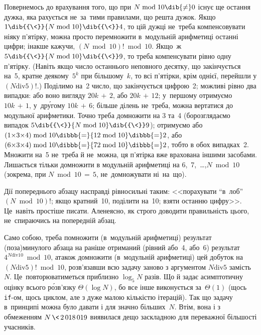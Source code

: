 Повернемось до врахування того, що при ${N\bmod10}\dib{{\neq}}0$ існує ще остання дужка, яка рахується не~за~тими правилами, що решта дужок. Якщо $1\dib{{\<}}{N\bmod10}\dib{{\<}}4$, то цій дужці не~треба компенсовувати ніяку п'ятірку, можна просто перемножити в~модульній арифметиці останні цифри; інакше кажучи, ${(N\bmod10)!\bmod10}$. Якщо~ж $5\dib{{\<}}{N\bmod10}\dib{{\<}}9$, то треба компенсувати рівно одну п'ятірку. (Навіть якщо число останнього неповного десятку, що закінчується на~5, кратне деякому~$5^k$ при більшому~$k$, то всі п'ятірки, крім однієї, перейшли у ${(N\mathbin{\mathrm{div}}5)!}$.) Поділимо на~2 число, що закінчується цифрою~2; можливі рівно два випадки: або воно вигляду $20k\,{+}\,2$, або $20k\,{+}\,12$; у~першому отримуємо $10k\,{+}\,1$, у~др\'{у}гому $10k\,{+}\,6$; більше ділень не~треба, можна вертатися до модульної арифметики. Точно треба домножити на 3 та~4 (бо\nolinebreak[3] розглядаємо випадок $5\dib{{\<}}{N\bmod10}\dib{{\<}}9$); отримуємо 
або ${(1{\times}3{\times}4)\bmod10}\dibbb{{=}}{12\bmod10}\dibbb{{=}}2$,
або ${(6{\times}3{\times}4)\bmod10}\dibbb{{=}}{72\bmod10}\dibbb{{=}}2$,
тобто в обох випадках~2. Множити на~5 не~треба й не~можна, ця п'ятірка вже врахована іншими засобами.
Лишається тільки домножити в модульній арифметиці на 6,~7,~\dots,\nolinebreak[2] ${N\bmod10}$ (зокрема, при ${N\bmod10\,{=}\,5}$, не~домножувати ні~на~що).

Дії попереднього абзацу насправді рівносильні таким: <<порахувати ``в~лоб'' ${(N\bmod10)!}$; якщо кратний~10, поділити на~10; взяти останню цифру>>. Це~навіть простіше писати. Але\nolinebreak[2] неясно, як строго доводити правильність цього, не~спираючись на попередній абзац.

Само собою, треба помножити (в~модульній арифметиці) результат (поза)минулого абзаца на раніше отриманий (рівний або~4, або~6) результат ${4^{N\mathbin{\mathrm{div}}10}\bmod10}$, а\nolinebreak[3] також домножити (в~модульній арифметиці) цей добуток на ${(N\mathbin{\mathrm{div}}5)!\bmod10}$, розв'язавши всю задачу заново з аргументом ${N\mathbin{\mathrm{div}}5}$ замість~$N$. Це~повторюватиметься приблизно $\log_{5}{N}$ разів. Що й задає асимптотичну оцінку всього р\'{о}зв'язку $\Theta(\log{N})$, бо все інше виконується за~$\Theta(1)$ (щось \mbox{\texttt{if}-ом}, щось циклом, але з дуже малою кількістю ітерацій). Так що задачу в~принципі можна було давати і для значно більших~$N$. Втім, вона і з обмеженням ${N\,{\<}\,2\,018\,019}$ виявилася дещо заскладною для переважної більшості учасників.
